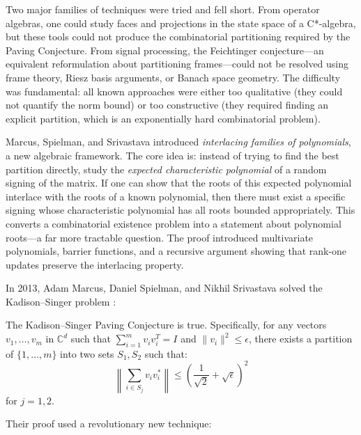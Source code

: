 Two major families of techniques were tried and fell short. From operator algebras, one could study faces and projections in the state space of a C*-algebra, but these tools could not produce the combinatorial partitioning required by the Paving Conjecture. From signal processing, the Feichtinger conjecture---an equivalent reformulation about partitioning frames---could not be resolved using frame theory, Riesz basis arguments, or Banach space geometry. The difficulty was fundamental: all known approaches were either too qualitative (they could not quantify the norm bound) or too constructive (they required finding an explicit partition, which is an exponentially hard combinatorial problem).

Marcus, Spielman, and Srivastava introduced \emph{interlacing families of polynomials}, a new algebraic framework. The core idea is: instead of trying to find the best partition directly, study the \emph{expected characteristic polynomial} of a random signing of the matrix. If one can show that the roots of this expected polynomial interlace with the roots of a known polynomial, then there must exist a specific signing whose characteristic polynomial has all roots bounded appropriately. This converts a combinatorial existence problem into a statement about polynomial roots---a far more tractable question. The proof introduced multivariate polynomials, barrier functions, and a recursive argument showing that rank-one updates preserve the interlacing property.

In 2013, Adam Marcus, Daniel Spielman, and Nikhil Srivastava solved the Kadison--Singer problem \cite{marcus2015a, marcus2015b}:

\begin{theorem}
The Kadison--Singer Paving Conjecture is true. Specifically, for any vectors $v_1, \ldots, v_m$ in $\mathbb{C}^d$ such that $\sum_{i=1}^m v_i v_i^T = I$ and $\|v_i\|^2 \leq \epsilon$, there exists a partition of $\{1, \ldots, m\}$ into two sets $S_1, S_2$ such that:
\begin{equation}
\left\|\sum_{i \in S_j} v_i v_i^*\right\| \leq \left(\frac{1}{\sqrt{2}}+\sqrt{\epsilon}\right)^2
\end{equation}
for $j=1,2$.
\end{theorem}

Their proof used a revolutionary new technique:

